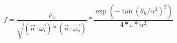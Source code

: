 \begin{equation}
     f = \frac{\rho_{s}}
              {\sqrt{({\vec{n}}\cdot{\vec{\omega_{i}}}) *
                     ({\vec{n}}\cdot{\vec{\omega_{o}}})}} * 
         \frac{\exp(-\tan{(\theta_{h}/\alpha^2)}^{2})}
              {4*\pi*\alpha^2}
\end{equation}